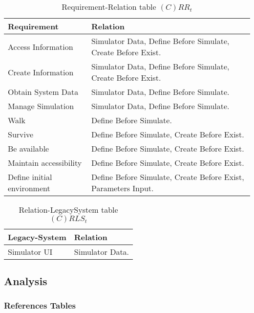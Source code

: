\begin{table}[H]
	\centering
	\begin{tabular}{|p{4cm}|p{8cm}|}
			\hline
			\textbf{Requirement} & \textbf{Relation} \\
			\hline
			Access Information & Simulator Data, Define Before Simulate, Create
			Before Exist. \\
			\hline
			Create Information & Simulator Data, Define Before Simulate, Create
			Before Exist. \\
			\hline
			Obtain System Data & Simulator Data, Define Before Simulate. \\
			\hline
			Manage Simulation & Simulator Data, Define Before Simulate. \\
			\hline
			Walk & Define Before Simulate. \\
			\hline
			Survive & Define Before Simulate, Create Before Exist. \\
			\hline
			Be available & Define Before Simulate, Create Before Exist. \\
			\hline
			Maintain accessibility & Define Before Simulate, Create Before Exist. \\
			\hline
			Define initial environment & Define Before Simulate, Create Before
			Exist, Parameters Input. \\
			\hline
		\end{tabular}
	\caption{Requirement-Relation table $(C)RR_t$}
	\label{tab:crrt}
\end{table}

\begin{table}[H]
	\centering
	\begin{tabular}{|p{4cm}|p{8cm}|}
			\hline
			\textbf{Legacy-System} & \textbf{Relation} \\
			\hline
			Simulator UI & Simulator Data. \\
			\hline
		\end{tabular}
	\caption{Relation-LegacySystem table $(C)RLS_t$}
	\label{tab:crlst}
\end{table}

\subsection{Analysis}

\subsubsection*{References Tables}

